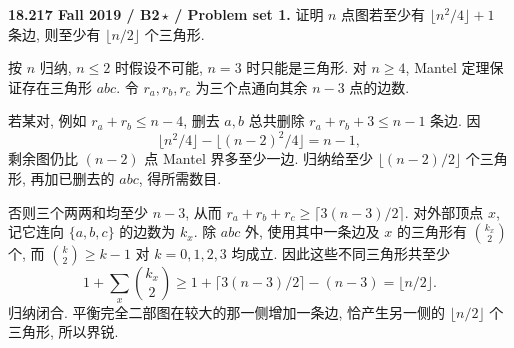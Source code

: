 \begin{exercise}\label{mit:18217-b2}
\textbf{18.217 Fall 2019 / B2\,$\star$ / Problem set 1.}
证明 $n$ 点图若至少有 $\lfloor n^2/4\rfloor+1$ 条边, 则至少有 $\lfloor n/2\rfloor$ 个三角形.
\end{exercise}
\begin{solution}
按 $n$ 归纳, $n\le2$ 时假设不可能, $n=3$ 时只能是三角形. 对 $n\ge4$, Mantel 定理保证存在三角形 $abc$. 令 $r_a,r_b,r_c$ 为三个点通向其余 $n-3$ 点的边数.

若某对, 例如 $r_a+r_b\le n-4$, 删去 $a,b$ 总共删除 $r_a+r_b+3\le n-1$ 条边. 因
\[
\lfloor n^2/4\rfloor-\lfloor(n-2)^2/4\rfloor=n-1,
\]
剩余图仍比 $(n-2)$ 点 Mantel 界多至少一边. 归纳给至少 $\lfloor(n-2)/2\rfloor$ 个三角形, 再加已删去的 $abc$, 得所需数目.

否则三个两两和均至少 $n-3$, 从而 $r_a+r_b+r_c\ge\lceil3(n-3)/2\rceil$. 对外部顶点 $x$, 记它连向 $\{a,b,c\}$ 的边数为 $k_x$. 除 $abc$ 外, 使用其中一条边及 $x$ 的三角形有 $\binom{k_x}{2}$ 个, 而 $\binom k2\ge k-1$ 对 $k=0,1,2,3$ 均成立. 因此这些不同三角形共至少
\[
1+\sum_x\binom{k_x}{2}
\ge1+\lceil3(n-3)/2\rceil-(n-3)
=\lfloor n/2\rfloor.
\]
归纳闭合. 平衡完全二部图在较大的那一侧增加一条边, 恰产生另一侧的 $\lfloor n/2\rfloor$ 个三角形, 所以界锐.
\end{solution}

